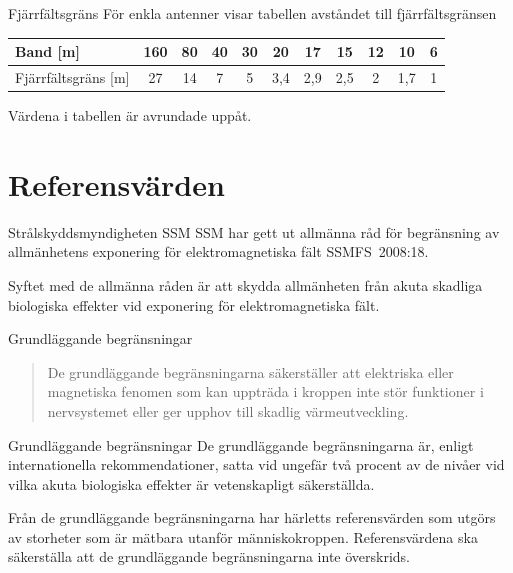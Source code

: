 \documentclass{beamer}
\begin{document}
\begin{frame}{Fjärrfältsgräns}
För enkla antenner visar tabellen avståndet till fjärrfältsgränsen

\begin{tabular}{|l|c|c|c|c|c|c|c|c|c|c|}
	\hline
	Band [m] & 160 & 80 & 40 & 30 & 20 & 17 & 15 & 12 & 10 & 6 \\ \hline
	Fjärrfältsgräns [m] & 27 & 14 & 7 & 5 & 3,4 & 2,9 & 2,5 & 2 & 1,7 & 1 \\ \hline
\end{tabular}
Värdena i tabellen är avrundade uppåt.
\end{frame}

\section{Referensvärden}

\begin{frame}{Strålskyddsmyndigheten SSM}
 SSM har gett ut allmänna råd för begränsning av allmänhetens exponering
 för elektromagnetiska fält SSMFS~2008:18.
 
 Syftet med de allmänna råden är att skydda allmänheten från akuta
 skadliga biologiska effekter vid exponering för elektromagnetiska fält.
\end{frame}

\begin{frame}{Grundläggande begränsningar}
 \begin{quote}
 	De grundläggande begränsningarna säkerställer att elektriska eller
 	magnetiska fenomen som kan uppträda i kroppen inte stör funktioner i
 	nervsystemet eller ger upphov till skadlig värmeutveckling.
 \end{quote}
 \end{frame}

\begin{frame}{Grundläggande begränsningar}
 De grundläggande begränsningarna är, enligt internationella rekommendationer,
satta vid ungefär två procent av de nivåer vid vilka akuta biologiska effekter
är vetenskapligt säkerställda. 

Från de grundläggande begränsningarna har härletts referensvärden som utgörs
av storheter som är mätbara utanför människokroppen.
Referensvärdena ska säkerställa att de grundläggande begränsningarna inte
överskrids.
\end{frame}
\end{document}
